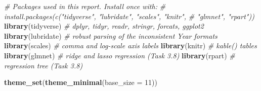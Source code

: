 \documentclass[
]{article}
\newenvironment{Shaded}{\begin{snugshade}}{\end{snugshade}}
\newcommand{\AttributeTok}[1]{\textcolor[rgb]{0.13,0.29,0.53}{#1}}
\newcommand{\CommentTok}[1]{\textcolor[rgb]{0.56,0.35,0.01}{\textit{#1}}}
\newcommand{\DecValTok}[1]{\textcolor[rgb]{0.00,0.00,0.81}{#1}}
\newcommand{\FunctionTok}[1]{\textcolor[rgb]{0.13,0.29,0.53}{\textbf{#1}}}
\newcommand{\NormalTok}[1]{#1}
\begin{document}
\begin{Shaded}
\begin{Highlighting}[]
\CommentTok{\# Packages used in this report. Install once with:}
\CommentTok{\# install.packages(c("tidyverse", "lubridate", "scales", "knitr",}
\CommentTok{\#                    "glmnet", "rpart"))}
\FunctionTok{library}\NormalTok{(tidyverse)  }\CommentTok{\# dplyr, tidyr, readr, stringr, forcats, ggplot2}
\FunctionTok{library}\NormalTok{(lubridate)  }\CommentTok{\# robust parsing of the inconsistent Year formats}
\FunctionTok{library}\NormalTok{(scales)     }\CommentTok{\# comma and log{-}scale axis labels}
\FunctionTok{library}\NormalTok{(knitr)      }\CommentTok{\# kable() tables}
\FunctionTok{library}\NormalTok{(glmnet)     }\CommentTok{\# ridge and lasso regression (Task 3.8)}
\FunctionTok{library}\NormalTok{(rpart)      }\CommentTok{\# regression tree (Task 3.8)}

\FunctionTok{theme\_set}\NormalTok{(}\FunctionTok{theme\_minimal}\NormalTok{(}\AttributeTok{base\_size =} \DecValTok{11}\NormalTok{))}
\end{Highlighting}
\end{Shaded}
\end{document}

